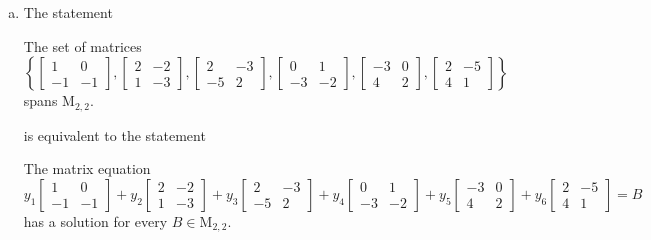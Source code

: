 \begin{exerciseAnswer}
\begin{enumerate}[(a)]
\item The statement 
\begin{center}\begin{minipage}{0.8\textwidth}
 The set of matrices \( \left\{ \left[\begin{array}{cc}
1 & 0 \\
-1 & -1
\end{array}\right] , \left[\begin{array}{cc}
2 & -2 \\
1 & -3
\end{array}\right] , \left[\begin{array}{cc}
2 & -3 \\
-5 & 2
\end{array}\right] , \left[\begin{array}{cc}
0 & 1 \\
-3 & -2
\end{array}\right] , \left[\begin{array}{cc}
-3 & 0 \\
4 & 2
\end{array}\right] , \left[\begin{array}{cc}
2 & -5 \\
4 & 1
\end{array}\right] \right\} \) spans \(\mathrm{M}_{2,2}\). 
\end{minipage}\end{center}
     is equivalent to the statement 
\begin{center}\begin{minipage}{0.8\textwidth}
 The matrix equation \[ y_{1} \left[\begin{array}{cc}
1 & 0 \\
-1 & -1
\end{array}\right] + y_{2} \left[\begin{array}{cc}
2 & -2 \\
1 & -3
\end{array}\right] + y_{3} \left[\begin{array}{cc}
2 & -3 \\
-5 & 2
\end{array}\right] + y_{4} \left[\begin{array}{cc}
0 & 1 \\
-3 & -2
\end{array}\right] + y_{5} \left[\begin{array}{cc}
-3 & 0 \\
4 & 2
\end{array}\right] + y_{6} \left[\begin{array}{cc}
2 & -5 \\
4 & 1
\end{array}\right] =B\] has a solution for every \(B \in \mathrm{M}_{2,2}\). 
\end{minipage}\end{center}
    

\end{enumerate}
\end{exerciseAnswer}
